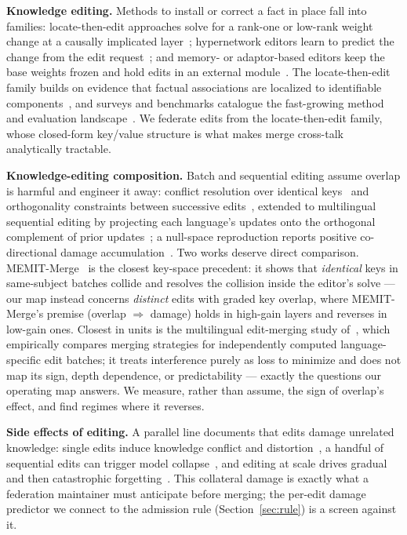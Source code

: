 \documentclass[preprint,12pt]{elsarticle}
\begin{document}
\textbf{Knowledge editing.} Methods to install or correct a fact in place fall into
families: locate-then-edit approaches solve for a rank-one or low-rank weight change at a
causally implicated layer~\cite{rome2022,memit2023,pmet2024,alphaedit2024}; hypernetwork
editors learn to predict the change from the edit request~\cite{decao2021,mend2022}; and
memory- or adaptor-based editors keep the base weights frozen and hold edits in an external
module~\cite{serac2022,grace2023,wise2024}. The locate-then-edit family builds on evidence
that factual associations are localized to identifiable
components~\cite{knowledgeneurons2022,rome2022}, and surveys and benchmarks catalogue the
fast-growing method and evaluation landscape~\cite{kesurvey2023,knowedit2024}. We federate
edits from the locate-then-edit family, whose closed-form key/value structure is what makes
merge cross-talk analytically tractable.

\textbf{Knowledge-editing composition.} Batch and sequential editing assume overlap is
harmful and engineer it away: conflict resolution over identical keys~\cite{memitmerge2025}
and orthogonality constraints between successive edits~\cite{oedit2024,orthoedit2026a,%
orthoedit2026b}, extended to multilingual sequential editing by projecting each
language's updates onto the orthogonal complement of prior updates~\cite{langedit2025};
a null-space reproduction reports positive co-directional damage
accumulation~\cite{alphaeditrepro2026}. Two works deserve direct comparison.
MEMIT-Merge~\cite{memitmerge2025} is the closest key-space precedent: it shows that
\emph{identical} keys in same-subject batches collide and resolves the collision inside
the editor's solve --- our map instead concerns \emph{distinct} edits with graded key
overlap, where MEMIT-Merge's premise (overlap $\Rightarrow$ damage) holds in high-gain
layers and reverses in low-gain ones. Closest in units is the multilingual
edit-merging study of~\cite{mke_merge2026}, which empirically compares merging
strategies for independently computed language-specific edit batches; it treats
interference purely as loss to minimize and does not map its sign, depth dependence,
or predictability --- exactly the questions our operating map answers. We measure,
rather than assume, the sign of overlap's effect, and find regimes where it reverses.

\textbf{Side effects of editing.} A parallel line documents that edits damage unrelated
knowledge: single edits induce knowledge conflict and distortion~\cite{pitfalls2024}, a
handful of sequential edits can trigger model collapse~\cite{butterfly2024}, and editing at
scale drives gradual and then catastrophic forgetting~\cite{seqforget2024}. This collateral
damage is exactly what a federation maintainer must anticipate before merging; the per-edit
damage predictor we connect to the admission rule (Section~\ref{sec:rule}) is a screen
against it.
\end{document}
